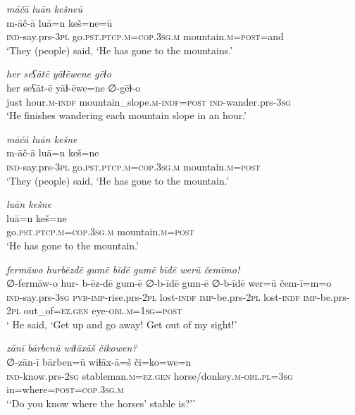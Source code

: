 \ea \label{ŠJ.11}
\textit{māčā luān kešneū} \\ 
\gll m-āč-ā luā=n keš=ne=ū \\ 
 \textsc{ind-}say.prs\textsc{-3pl} go\textsc{.pst}\textsc{.ptcp}\textsc{.m}\textsc{=cop}\textsc{.3sg}\textsc{.m} mountain\textsc{.m}\textsc{=\textsc{post}}=and \\ 
\glt `They (people) said, ‘He has gone to the mountains.'
\z 
 
\ea \label{ŠJ.18}
\textit{her seʕātē yāɫēwene gēɫo} \\ 
\gll her seʕāt-ē yāɫ-ēwe=ne ∅-gēɫ-o \\ 
 just hour\textsc{.m}\textsc{-indf} mountain\_slope\textsc{.m}\textsc{-indf}\textsc{=\textsc{post}} \textsc{ind-}wander.prs\textsc{-3sg} \\ 
\glt `He finishes wandering each mountain slope  in an hour.'
\z 
 
\ea \label{ŠJ.23}
\textit{māčā luān kešne} \\ 
\gll m-āč-ā luā=n keš=ne \\ 
 \textsc{ind-}say.prs\textsc{-3pl} go\textsc{.pst}\textsc{.ptcp}\textsc{.m}\textsc{=cop}\textsc{.3sg}\textsc{.m} mountain\textsc{.m}\textsc{=\textsc{post}} \\ 
\glt `They (people) said, ‘He has gone to the mountain.'
\z 
 
\ea \label{ŠJ.24}
\textit{luān kešne} \\ 
\gll luā=n keš=ne \\ 
 go\textsc{.pst}\textsc{.ptcp}\textsc{.m}\textsc{=cop}\textsc{.3sg}\textsc{.m} mountain\textsc{.m}\textsc{=\textsc{post}} \\ 
\glt `He has gone to the mountain.'
\z 
 
\ea \label{ŠJ.37}
\textit{fermāwo hurbēzdē gumē bīdē gumē bīdē werū čemīmo!} \\ 
\gll ∅-fermāw-o hur- b-ēz-dē gum-ē ∅-b-īdē gum-ē ∅-b-īdē wer=ū čem-ī=m=o \\ 
 \textsc{ind-}say.prs\textsc{-3sg} \textsc{pvb-}\textsc{imp-}rise.prs-\textsc{2pl} lost\textsc{-indf} \textsc{imp-}be.prs-\textsc{2pl} lost\textsc{-indf} \textsc{imp-}be.prs-\textsc{2pl} out\_of\textsc{=ez.gen} eye\textsc{-obl}\textsc{.m}\textsc{=\textsc{1sg}}\textsc{=\textsc{post}} \\ 
\glt ` He said, ‘Get up and go away! Get out of my sight!'
\z 
 
\ea \label{ŠJ.60}
\textit{zānī bārbenū wiɫāxāš čikowen?} \\ 
\gll ∅-zān-ī bārben=ū wiɫāx-ā=š či=ko=we=n \\ 
 \textsc{ind-}know.prs-\textsc{2sg} stableman\textsc{.m}\textsc{=ez.gen} horse/donkey\textsc{.m}\textsc{-obl}\textsc{.pl}\textsc{=3sg} in=where\textsc{=\textsc{post}}\textsc{=cop}\textsc{.3sg}\textsc{.m} \\ 
\glt `‘Do you know where the horses’ stable is?’'
\z 
 
